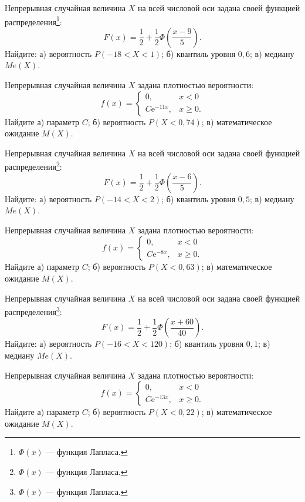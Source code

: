 \vfill

\newpage\setcounter{zad}{0}

\z Непрерывная случайная величина $X$ на всей числовой оси задана своей функцией распределения\footnote{$\Phi(x)$ --- функция Лапласа.}: $$ F(x) = \frac{1}{2} + \frac{1}{2}\Phi\left( \frac{x - 9}{5} \right). $$ Найдите: а) вероятность $P(-18 < X < 1)$; б) квантиль уровня $0{,}6$; в) медиану $Me(X)$.


\vfill

\z Непрерывная случайная величина $X$ задана плотностью вероятности: $$ f(x) = \begin{cases}0, & x < 0 \\ C\mathrm{e}^{-11x}, & x \geqslant 0.\end{cases} $$ Найдите а) параметр $C$; б) вероятность $P(X < 0{,}74)$; в) математическое ожидание $M(X)$.
 

\vfill

\newpage\setcounter{zad}{0}

\z Непрерывная случайная величина $X$ на всей числовой оси задана своей функцией распределения\footnote{$\Phi(x)$ --- функция Лапласа.}: $$ F(x) = \frac{1}{2} + \frac{1}{2}\Phi\left( \frac{x - 6}{5} \right). $$ Найдите: а) вероятность $P(-14 < X < 2)$; б) квантиль уровня $0{,}5$; в) медиану $Me(X)$.


\vfill

\z Непрерывная случайная величина $X$ задана плотностью вероятности: $$ f(x) = \begin{cases}0, & x < 0 \\ C\mathrm{e}^{-8x}, & x \geqslant 0.\end{cases} $$ Найдите а) параметр $C$; б) вероятность $P(X < 0{,}63)$; в) математическое ожидание $M(X)$.
 

\vfill

\newpage\setcounter{zad}{0}

\z Непрерывная случайная величина $X$ на всей числовой оси задана своей функцией распределения\footnote{$\Phi(x)$ --- функция Лапласа.}: $$ F(x) = \frac{1}{2} + \frac{1}{2}\Phi\left( \frac{x + 60}{40} \right). $$ Найдите: а) вероятность $P(-16 < X < 120)$; б) квантиль уровня $0{,}1$; в) медиану $Me(X)$.


\vfill

\z Непрерывная случайная величина $X$ задана плотностью вероятности: $$ f(x) = \begin{cases}0, & x < 0 \\ C\mathrm{e}^{-13x}, & x \geqslant 0.\end{cases} $$ Найдите а) параметр $C$; б) вероятность $P(X < 0{,}22)$; в) математическое ожидание $M(X)$.
 


